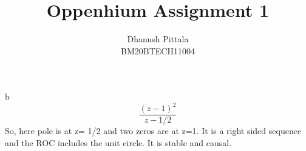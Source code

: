\documentclass[12pt]{article}
\begin{document}
	\title{Oppenhium Assignment 1}
	\author{Dhanush Pittala\\BM20BTECH11004}
	b
	\begin{equation}
		\frac {(z-1)^{2}}{z-1/2}
	\end{equation}
	So, here pole is at z= 1/2 and two zeros are at z=1. It is a right sided sequence and the ROC includes the unit circle. It is stable and causal.
\end{document}
